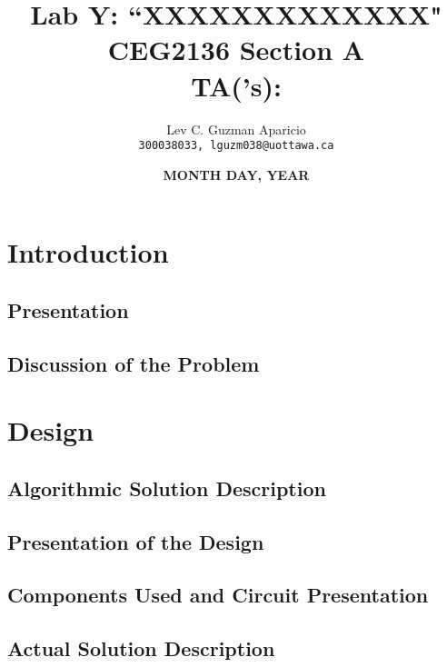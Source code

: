 \documentclass[14pt, a4paper]{article}
\title{ 
	\textbf{\huge \centering Lab Y: ``XXXXXXXXXXXXX" } \newline \newline 
	{\Large \centering CEG2136 Section A 
		\\ TA('s):  }
	   }
\author{ Lev C. Guzman Aparicio\\
	\texttt{300038033, lguzm038@uottawa.ca} }
\date{\textbf{MONTH DAY, YEAR}}
\begin{document}
	
	\begin{titlepage}
		\maketitle
	\end{titlepage}

	{ \large \tableofcontents }
	\newpage
	



		\section{Introduction}
		
			\subsection{Presentation}
		
		
			\subsection{Discussion of the Problem}
			
			
	
		\section{Design}
		
			\subsection{Algorithmic Solution Description}
			
			
			
			\subsection{Presentation of the Design}
			
			
			
			\subsection{Components Used and Circuit Presentation}
			
			
			
			\subsection{Actual Solution Description}
			
			
			
\end{document}
